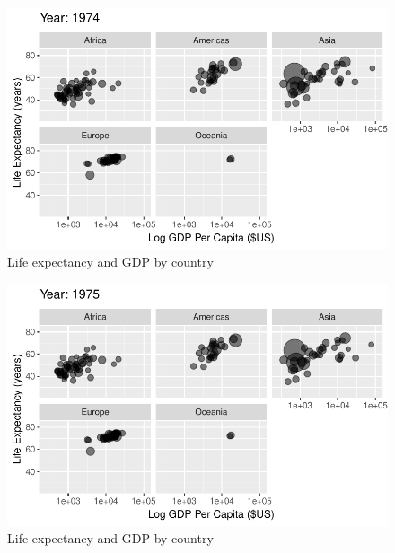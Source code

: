 \documentclass[
  letterpaper,
  DIV=11,
  numbers=noendperiod]{scrreport}
\theoremstyle{definition}
\theoremstyle{remark}
\begin{document}
\begin{figure}

{\centering \includegraphics{index_files/figure-pdf/fig-anim-lifegdp-41.pdf}

}

\caption{\label{fig-anim-lifegdp-41}Life expectancy and GDP by country}

\end{figure}

\begin{figure}

{\centering \includegraphics{index_files/figure-pdf/fig-anim-lifegdp-42.pdf}

}

\caption{\label{fig-anim-lifegdp-42}Life expectancy and GDP by country}

\end{figure}
\end{document}
